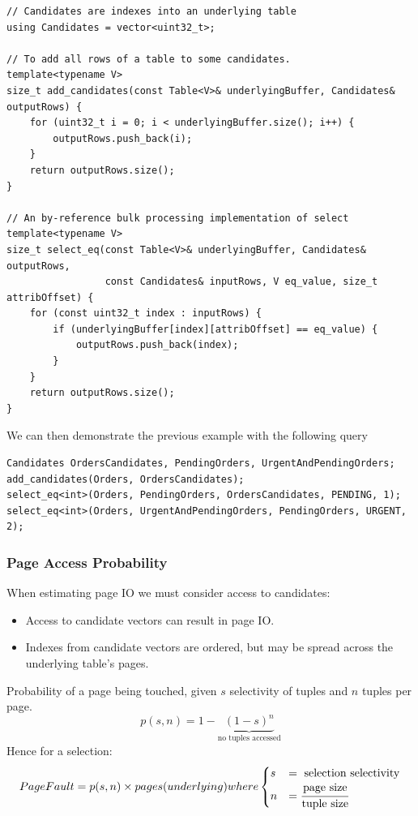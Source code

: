 \begin{verbatim}
// Candidates are indexes into an underlying table
using Candidates = vector<uint32_t>;

// To add all rows of a table to some candidates.
template<typename V>
size_t add_candidates(const Table<V>& underlyingBuffer, Candidates& outputRows) {
    for (uint32_t i = 0; i < underlyingBuffer.size(); i++) {
        outputRows.push_back(i);
    }
    return outputRows.size();
}

// An by-reference bulk processing implementation of select
template<typename V>
size_t select_eq(const Table<V>& underlyingBuffer, Candidates& outputRows, 
                 const Candidates& inputRows, V eq_value, size_t attribOffset) {
    for (const uint32_t index : inputRows) {
        if (underlyingBuffer[index][attribOffset] == eq_value) {
            outputRows.push_back(index);
        }
    }
    return outputRows.size();
}
\end{verbatim}
We can then demonstrate the previous example with the following query
\begin{verbatim}
Candidates OrdersCandidates, PendingOrders, UrgentAndPendingOrders;
add_candidates(Orders, OrdersCandidates);
select_eq<int>(Orders, PendingOrders, OrdersCandidates, PENDING, 1);
select_eq<int>(Orders, UrgentAndPendingOrders, PendingOrders, URGENT, 2);
\end{verbatim}

\subsubsection{Page Access Probability}
When estimating page IO we must consider access to candidates:
\begin{itemize}
  \item Access to candidate vectors can result in page IO.
  \item Indexes from candidate vectors are ordered, but may be spread across the underlying table's pages.
\end{itemize}
Probability of a page being touched, given $s$ selectivity of tuples and $n$ tuples per page.
\[p(s,n) = 1 - \underbrace{(1-s)^n}_{\text{no tuples accessed}}\]
Hence for a selection:
\[PageFault = p(s,n) \times pages(underlying) where \begin{cases}
  s & = \text{ selection selectivity} \\
  n & = \cfrac{\text{page size}}{\text{tuple size}} \\
\end{cases}\]

